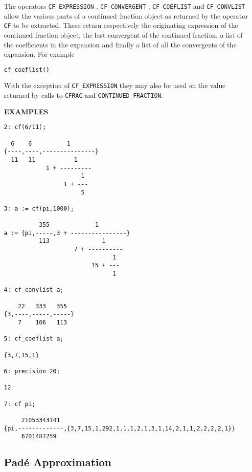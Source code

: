 The operators \texttt{CF\_EXPRESSION} ,
\texttt{CF\_CONVERGENT} ,
\texttt{CF\_COEFLIST}  and
\texttt{CF\_CONVLIST}  allow the various
parts of a continued fraction object as returned by the operator
\texttt{CF} to be extracted. These return respectively the originating
expression of the continued fraction object, the last convergent of the
continued fraction, a list of the coefficients in the expansion and finally
a list of all the convergents of the expansion.
For example
\begin{syntaxtable}
    \texttt{cf\_coeflist(}\texttt{)} 
\end{syntaxtable}

With the exception of \texttt{CF\_EXPRESSION} they may also be used on the
value returned by calls to 
\texttt{CFRAC} and \texttt{CONTINUED\_FRACTION}. 

\large{\textbf{EXAMPLES}}

\begin{verbatim}
2: cf(6/11);

  6    6          1
{----,----,---------------}
  11   11           1
            1 + ---------
                      1
                 1 + ---
                      5

3: a := cf(pi,1000);

          355             1
a := {pi,-----,3 + ----------------}
          113               1
                    7 + ----------
                               1
                         15 + ---
                               1

4: cf_convlist a;

    22   333   355
{3,----,-----,-----}
    7    106   113

5: cf_coeflist a;

{3,7,15,1}

6: precision 20;

12

7: cf pi;

     21053343141
{pi,-------------,{3,7,15,1,292,1,1,1,2,1,3,1,14,2,1,1,2,2,2,2,1}}
     6701487259

\end{verbatim}

\subsection{Pad\'{e} Approximation}

